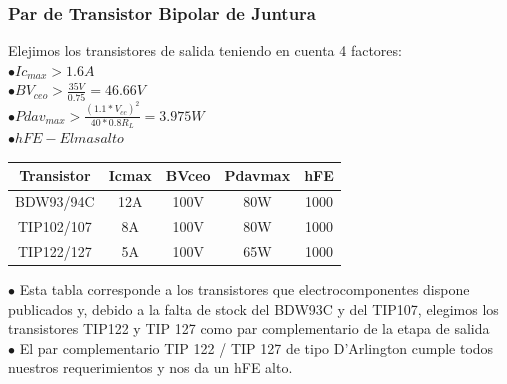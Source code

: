 \documentclass[12pt,a4paper]{report}
\begin{document}
\begin{flushleft}
\subsubsection{Par de Transistor Bipolar de Juntura}
Elejimos los transistores de salida teniendo en cuenta 4 factores: \\ \vspace{0.2cm}
\hspace{1cm}	$ \bullet Ic_{max} > 1.6A $\\ \vspace{0.2cm}
\hspace{1cm}	$ \bullet BV_{ceo} > \frac{35V}{0.75} = 46.66V $\\ \vspace{0.2cm}
\hspace{1cm}	$ \bullet Pdav_{max}  >  \frac{(1.1 * V_{cc})^2}{40 * 0.8 R_L} = 3.975W $\\ \vspace{0.2cm}
\hspace{1cm}	$ \bullet hFE - El mas alto $\\ 
\vspace{1cm}

\begin{center}
\begin{tabular}{ |c|c|c|c|c| } 
\hline
Transistor & Icmax & BVceo & Pdavmax & hFE \\
\hline
BDW93/94C & 12A  & 100V & 80W & 1000 \\
\hline
TIP102/107 & 8A & 100V & 80W & 1000\\
\hline
TIP122/127 & 5A & 100V & 65W & 1000 \\
\hline
\end{tabular}
\end{center}
\vspace{0.2cm}

$ \bullet $  Esta tabla corresponde a los transistores que electrocomponentes dispone publicados y, debido a la falta de stock del BDW93C y del TIP107, elegimos los transistores TIP122 y TIP 127 como par complementario de la etapa de salida\\
$ \bullet $  El par complementario TIP 122 / TIP 127 de tipo D'Arlington cumple todos nuestros requerimientos y nos da un hFE alto.\\



\end{flushleft}
\end{document}

